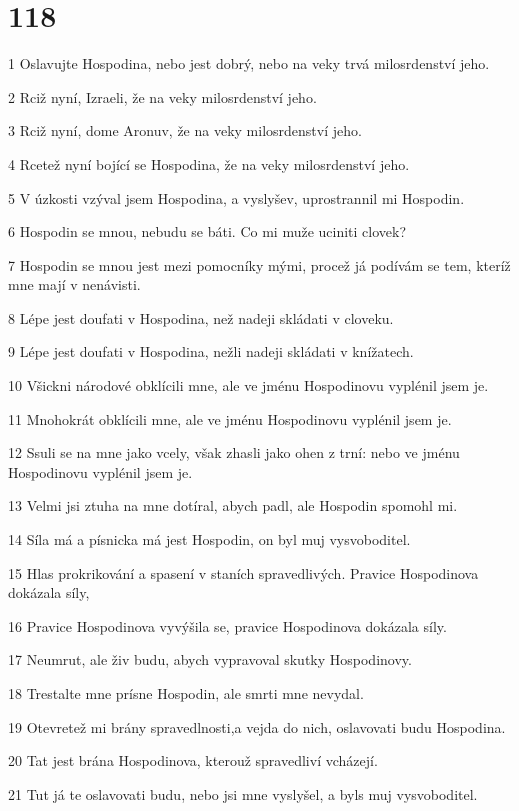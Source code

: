 \chapter{118}

\par 1 Oslavujte Hospodina, nebo jest dobrý, nebo na veky trvá milosrdenství jeho.
\par 2 Rciž nyní, Izraeli, že na veky milosrdenství jeho.
\par 3 Rciž nyní, dome Aronuv, že na veky milosrdenství jeho.
\par 4 Rcetež nyní bojící se Hospodina, že na veky milosrdenství jeho.
\par 5 V úzkosti vzýval jsem Hospodina, a vyslyšev, uprostrannil mi Hospodin.
\par 6 Hospodin se mnou, nebudu se báti. Co mi muže uciniti clovek?
\par 7 Hospodin se mnou jest mezi pomocníky mými, procež já podívám se tem, kteríž mne mají v nenávisti.
\par 8 Lépe jest doufati v Hospodina, než nadeji skládati v cloveku.
\par 9 Lépe jest doufati v Hospodina, nežli nadeji skládati v knížatech.
\par 10 Všickni národové obklícili mne, ale ve jménu Hospodinovu vyplénil jsem je.
\par 11 Mnohokrát obklícili mne, ale ve jménu Hospodinovu vyplénil jsem je.
\par 12 Ssuli se na mne jako vcely, však zhasli jako ohen z trní: nebo ve jménu Hospodinovu vyplénil jsem je.
\par 13 Velmi jsi ztuha na mne dotíral, abych padl, ale Hospodin spomohl mi.
\par 14 Síla má a písnicka má jest Hospodin, on byl muj vysvoboditel.
\par 15 Hlas prokrikování a spasení v staních spravedlivých. Pravice Hospodinova dokázala síly,
\par 16 Pravice Hospodinova vyvýšila se, pravice Hospodinova dokázala síly.
\par 17 Neumrut, ale živ budu, abych vypravoval skutky Hospodinovy.
\par 18 Trestalte mne prísne Hospodin, ale smrti mne nevydal.
\par 19 Otevretež mi brány spravedlnosti,a vejda do nich, oslavovati budu Hospodina.
\par 20 Tat jest brána Hospodinova, kterouž spravedliví vcházejí.
\par 21 Tut já te oslavovati budu, nebo jsi mne vyslyšel, a byls muj vysvoboditel.
